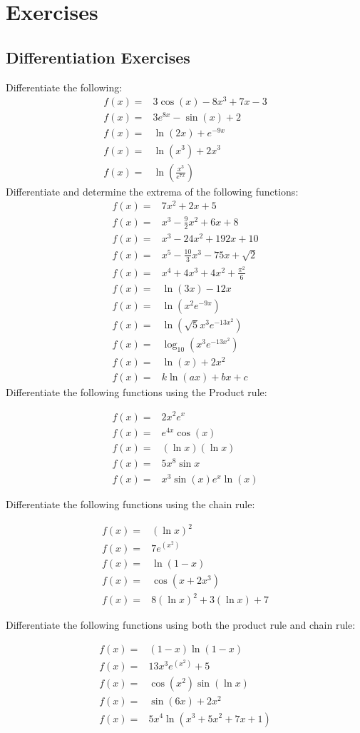 \documentclass[main.tex]{subfiles}
\begin{document}
\section{Exercises}
\subsection{Differentiation Exercises}
Differentiate the following:
\begin{align}
f(x) =& 3 \cos(x)-8x^3+7x-3\\
f(x) =& 3e^{8x}-\sin(x)+2\\
f(x) =& \ln(2x) + e^{-9x}\\
f(x) =& \ln(x^3)+2x^3\\
f(x) =& \ln\left(\frac{x^3}{e^{7x}}\right)
\end{align}
Differentiate and determine the extrema of the following functions:
\begin{align}
f(x) =& 7x^2+2x+5\\
f(x) =& x^3-\frac{9}{2}x^2+6x+8\\
f(x) =& x^3-24x^2+192x+10\\
f(x) =& x^5-\frac{10}{3}x^3-75x+\sqrt{2}\\
f(x) =& x^4+4x^3+4x^2+\frac{\pi^2}{6}\\
f(x) =& \ln(3x)-12x\\
f(x) =& \ln(x^2e^{-9x})\\
f(x) =& \ln(\sqrt{5}x^3e^{-13x^2})\\
f(x) =& \log_{10}(x^3e^{-13x^2})\\
f(x) =& \ln(x) + 2x^2\\
f(x) =& k\ln(ax) + bx+c
\end{align}
Differentiate the following functions using the Product rule:

\begin{align}
f(x) =& 2x^2e^x\\
f(x) =& e^{4x}\cos(x)\\
f(x) =& (\ln{x})(\ln{x})\\
f(x) =& 5x^8\sin{x}\\
f(x) =& x^3\sin{(x)}e^x\ln{(x)}
\end{align}

Differentiate the following functions using the chain rule:

\begin{align}
f(x) =& (\ln{x})^2\\
f(x) =& 7e^{(x^2)}\\
f(x) =& \ln{(1-x)}\\
f(x) =& \cos{(x+2x^3)}\\
f(x) =& 8(\ln{x})^2 + 3 (\ln{x}) + 7
\end{align}

Differentiate the following functions using both the product rule and chain rule:

\begin{align}
f(x) =& (1-x)\ln{(1-x)}\\
f(x) =& 13x^3e^{(x^2)} + 5\\
f(x) =& \cos{(x^2)}\sin{(\ln{x})}\\
f(x) =& \sin{(6x)} + 2x^2\\
f(x) =& 5x^4\ln{(x^3 + 5x^2 + 7x + 1)}
\end{align}
\end{document}
